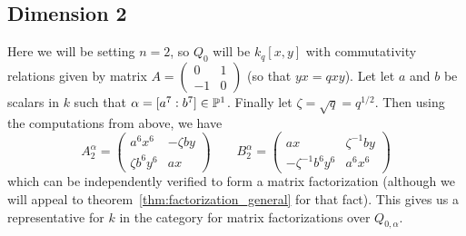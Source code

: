\documentclass [11pt, proquest] {uwthesis}[2020/02/24]
\begin{document}
\subsection{Dimension 2}\label{subsec:dim-two-factorization}
    Here we will be setting $n=2$, so $Q_0$ will be $k_q[x,y]$ with commutativity relations given by matrix $A=(\begin{smallmatrix}0 & 1\\-1 & 0\end{smallmatrix})$ (so that $yx=qxy$). Let let $a$ and $b$ be scalars in $k$ such that $\alpha=[a^7:b^7]\in\mathbb{P}^1$. Finally let $\zeta=\sqrt{q}=q^{1/2}.$ Then using the computations from above, we have
    \[A_2^\alpha=
    \begin{pmatrix}
        a^6x^6 & -\zeta by\\ 
        \zeta b^6y^6 & ax
    \end{pmatrix}\qquad B_2^\alpha=
    \begin{pmatrix}
        ax & \zeta^{-1} by\\ 
        -\zeta^{-1} b^6y^{6} & a^6 x^{6}
    \end{pmatrix}\]
    which can be independently verified to form a matrix factorization (although we will appeal to theorem~\ref{thm:factorization_general} for that fact). This gives us a representative for $k$ in the category for matrix factorizations over $Q_{0,\alpha}$.
\end{document}
